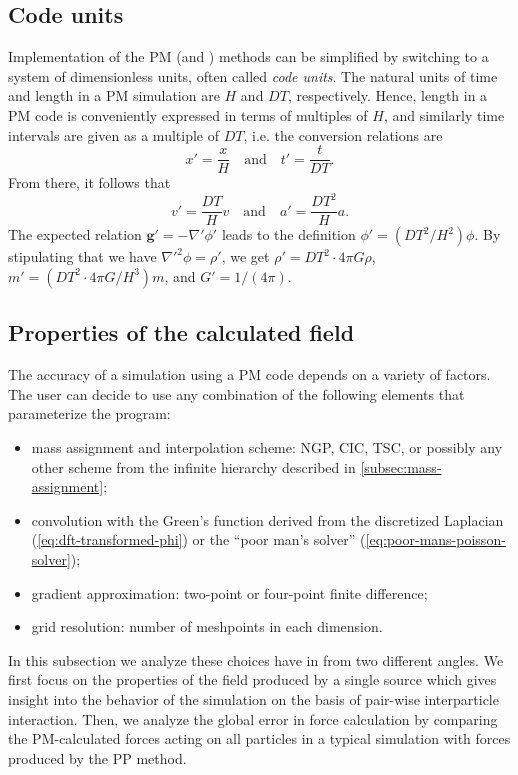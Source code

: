 \subsection{Code units}
Implementation of the PM (and \PThreeM{}) methods can be simplified by switching to a system of dimensionless units, often called \textit{code units}.
The natural units of time and length in a PM simulation are $H$ and $DT$, respectively.
Hence, length in a PM code is conveniently expressed in terms of multiples of $H$, and similarly time intervals are given as a multiple of $DT$, i.e. the conversion relations are
\begin{equation*}
    x' = \frac{x}{H} \quad \text{and} \quad t' = \frac{t}{DT}.
\end{equation*}
From there, it follows that
\begin{equation*}
    v' = \frac{DT}{H}v \quad \text{and} \quad a' = \frac{DT^2}{H}a.
\end{equation*}
The expected relation $\mathbf{g}' = -\nabla' \phi'$ leads to the definition $\phi' = (DT^2 / H^2)\phi$.
By stipulating that we have $\nabla'^2\phi = \rho'$, we get $\rho' = DT^2 \cdot 4\pi G\rho$, $m' = (DT^2\cdot 4\pi G / H^3) m$, and $G' = 1/(4\pi)$.

\subsection{Properties of the calculated field}
The accuracy of a simulation using a PM code depends on a variety of factors.
The user can decide to use any combination of the following elements that parameterize the program:
\begin{itemize}
    \item mass assignment and interpolation scheme: NGP, CIC, TSC, or possibly any other scheme from the infinite hierarchy described in \autoref{subsec:mass-assignment};
    \item convolution with the Green's function derived from the discretized Laplacian (\autoref{eq:dft-transformed-phi}) or the ``poor man's solver'' (\autoref{eq:poor-mans-poisson-solver});
    \item gradient approximation: two-point or four-point finite difference;
    \item grid resolution: number of meshpoints in each dimension.
\end{itemize}
In this subsection we analyze these choices have in from two different angles.
We first focus on the properties of the field produced by a single source which gives insight into the behavior of the simulation on the basis of pair-wise interparticle interaction.
Then, we analyze the global error in force calculation by comparing the PM-calculated forces acting on all particles in a typical simulation with forces produced by the PP method.

